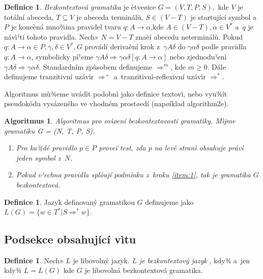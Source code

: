 \documentclass[11pt, a4paper]{article}
\theoremstyle{plain}
\theoremstyle{definition}
\newtheorem{definice}[noreset]{Definice}
\theoremstyle{plain}
\newtheorem{algoritmus}[noreset]{Algoritmus}
\begin{document}
  \begin{definice} 
    \label{def:1}\emph{Bezkontextová gramatika} je ètveøice $G = (V,T,P,S),$ kde $V$ je totální abeceda, $T \subseteq V$ je abeceda terminálù, $S \in (V-T)$ je startující symbol a~$P$ je koneèná mno¾ina pravidel tvaru $q\colon A \rightarrow \alpha$,kde $A \in (V-T), \alpha \in V^*$ a~$q$ je návì¹tí tohoto pravidla. Nech» $N=V-T$ znaèí abecedu neterminálù. Pokud $q\colon A \rightarrow \alpha \in P, \gamma, \delta \in V^*, G$ provádí derivaèní krok z~$\gamma A\delta$ do $\gamma \alpha \delta$ podle pravidla $q\colon A \rightarrow \alpha$, symbolicky pí¹eme $\gamma A \delta \Rightarrow \gamma \alpha \delta  [ q\colon A \rightarrow \alpha ]$ nebo zjednodu¹enì $\gamma A \delta \Rightarrow \gamma \alpha \delta$. Standardním zpùsobem definujeme $\Rightarrow^m$, kde $m \geq 0$. Dále definujeme tranzitivní uzávìr $\Rightarrow^+$ a~tranzitivnì-reflexivní uzávìr $\Rightarrow^*$. 
  \end{definice}

  Algoritmus mù¾eme uvádìt podobnì jako definice textovì, nebo vyu¾ít pseudokódu vysázeného ve vhodném prostøedí (napøíklad {\selectfont algorithm2e}).

  \begin{algoritmus}
    Algoritmus pro ovìøení bezkontextovosti gramatiky. Mìjme gramatiku G = (N, T, P, S).
    \begin{enumerate}
      \item \label{item:1}Pro ka¾dé pravidlo $p \in P$ proveï test, zda $p$ na levé stranì obsahuje právì jeden symbol z~$N$.
      \item Pokud v¹echna pravidla splòují podmínku z~kroku \ref{item:1}, tak je gramatika $G$ bezkontextová.
    \end{enumerate}
  \end{algoritmus}

  \begin{definice}
    Jazyk definovaný gramatikou $G$ definujeme jako $L(G) = \{ w \in T^*|S \Rightarrow^* w \}$.
  \end{definice}

    \subsection {Podsekce obsahující vìtu}

      \begin{definice}
        Nech» $L$ je libovolný jazyk. $L$ \emph{je bezkontextový jazyk }, kdy¾ a~jen kdy¾ $L = L(G)$ kde $G$ je libovolná bezkontextová gramatika.
      \end{definice}
\end{document}
